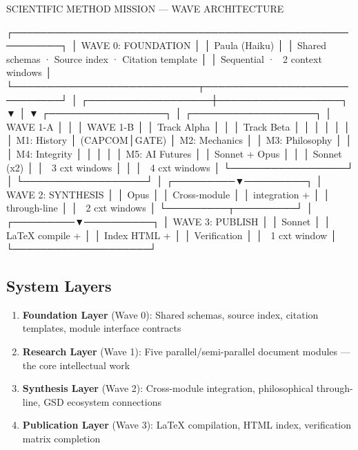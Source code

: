 \documentclass[11pt,letterpaper]{article}
\begin{document}
\begin{asciibox}
  SCIENTIFIC METHOD MISSION — WAVE ARCHITECTURE

  ┌─────────────────────────────────────────────────────────┐
  │  WAVE 0: FOUNDATION                                     │
  │  Paula (Haiku)                                          │
  │  Shared schemas · Source index · Citation template      │
  │  Sequential · ~2 context windows                        │
  └───────────────────────────┬─────────────────────────────┘
                              │
           ┌──────────────────┼──────────────────┐
           ▼                  │                  ▼
  ┌─────────────────┐         │        ┌──────────────────┐
  │  WAVE 1-A       │         │        │  WAVE 1-B        │
  │  Track Alpha    │         │        │  Track Beta      │
  │                 │         │        │                  │
  │  M1: History    │  (CAPCOM│GATE)   │  M2: Mechanics   │
  │  M3: Philosophy │         │        │  M4: Integrity   │
  │                 │         │        │  M5: AI Futures  │
  │  Sonnet + Opus  │         │        │  Sonnet (x2)     │
  │  ~3 cxt windows │         │        │  ~4 cxt windows  │
  └─────────────────┘         │        └──────────────────┘
                              │
                    ┌─────────▼─────────┐
                    │  WAVE 2: SYNTHESIS │
                    │  Opus             │
                    │  Cross-module     │
                    │  integration +    │
                    │  through-line     │
                    │  ~2 cxt windows   │
                    └─────────┬─────────┘
                              │
                    ┌─────────▼──────────┐
                    │  WAVE 3: PUBLISH   │
                    │  Sonnet            │
                    │  LaTeX compile +   │
                    │  Index HTML +      │
                    │  Verification      │
                    │  ~1 cxt window     │
                    └────────────────────┘
\end{asciibox}

\subsection{System Layers}

\begin{enumerate}
  \item \textbf{Foundation Layer} (Wave 0): Shared schemas, source index, citation templates, module interface contracts
  \item \textbf{Research Layer} (Wave 1): Five parallel/semi-parallel document modules --- the core intellectual work
  \item \textbf{Synthesis Layer} (Wave 2): Cross-module integration, philosophical through-line, GSD ecosystem connections
  \item \textbf{Publication Layer} (Wave 3): LaTeX compilation, HTML index, verification matrix completion
\end{enumerate}
\end{document}
